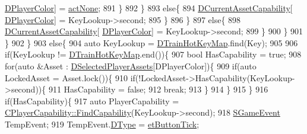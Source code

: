 \begin{DoxyCode}
      \hyperlink{classCApplicationData_a53550939b20cba70570f113e4d1c5d02}{DPlayerColor}] = \hyperlink{GameDataTypes_8h_a35b98ce26aca678b03c6f9f76e4778ceaa8df154ad276f6f62054e9b5b0696f92}{actNone};
891                                 \}
892                             \}
893                             \textcolor{keywordflow}{else}\{ 
894                                 \hyperlink{classCApplicationData_a7e0dbfdc54f73dfa9838ae81b8017e2d}{DCurrentAssetCapability}[
      \hyperlink{classCApplicationData_a53550939b20cba70570f113e4d1c5d02}{DPlayerColor}] = KeyLookup->second;
895                             \}
896                         \}
897                         \textcolor{keywordflow}{else}\{
898                             \hyperlink{classCApplicationData_a7e0dbfdc54f73dfa9838ae81b8017e2d}{DCurrentAssetCapability}[
      \hyperlink{classCApplicationData_a53550939b20cba70570f113e4d1c5d02}{DPlayerColor}] = KeyLookup->second;
899                         \}
900                     \}
901                 \}
902             \}
903             \textcolor{keywordflow}{else}\{
904                 \textcolor{keyword}{auto} KeyLookup = \hyperlink{classCApplicationData_a35798136764b6d2ede555494752e83eb}{DTrainHotKeyMap}.find(Key);
905                 
906                 \textcolor{keywordflow}{if}(KeyLookup != \hyperlink{classCApplicationData_a35798136764b6d2ede555494752e83eb}{DTrainHotKeyMap}.end())\{
907                     \textcolor{keywordtype}{bool} HasCapability = \textcolor{keyword}{true};
908                     \textcolor{keywordflow}{for}(\textcolor{keyword}{auto} &Asset : \hyperlink{classCApplicationData_a05c1087d5a5c4ddc14fcb37444f1642b}{DSelectedPlayerAssets}[DPlayerColor])\{
909                         \textcolor{keywordflow}{if}(\textcolor{keyword}{auto} LockedAsset = Asset.lock())\{   
910                             \textcolor{keywordflow}{if}(!LockedAsset->HasCapability(KeyLookup->second))\{
911                                 HasCapability = \textcolor{keyword}{false};
912                                 \textcolor{keywordflow}{break};
913                             \}
914                         \}
915                     \}
916                     \textcolor{keywordflow}{if}(HasCapability)\{
917                         \textcolor{keyword}{auto} PlayerCapability = 
      \hyperlink{classCPlayerCapability_a881ba4b87385d7cfe5cb6ced2d26f226}{CPlayerCapability::FindCapability}(KeyLookup->second); 
918                         \hyperlink{structSGameEvent}{SGameEvent} TempEvent;
919                         TempEvent.\hyperlink{structSGameEvent_afa10562e243f4ac2b473b655cc58fee7}{DType} = \hyperlink{GameModel_8h_abfcf510bafec7c6429906a6ecaac656dafe7284f9af34794514e5dbfe974e3296}{etButtonTick};

\end{DoxyCode}
